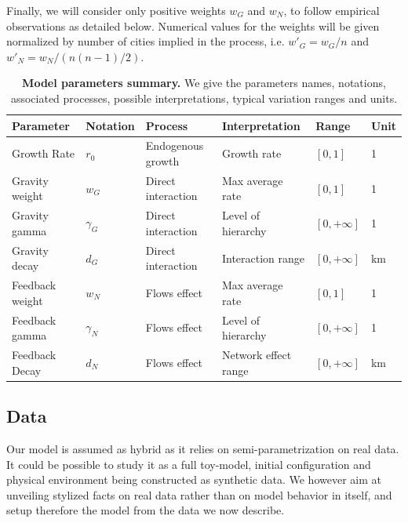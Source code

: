 \documentclass{article}
\begin{document}
Finally, we will consider only positive weights $w_G$ and $w_N$, to follow empirical observations as detailed below. Numerical values for the weights will be given normalized by number of cities implied in the process, i.e. ${w'}_G = w_G / n$ and ${w'}_N = w_N / (n (n-1) / 2)$.



\begin{table}[ht]
\small\sf\centering
\caption{\textbf{Model parameters summary.} We give the parameters names, notations, associated processes, possible interpretations, typical variation ranges and units.}\label{tab:parameters}
\hspace{-0.5cm}
\begin{tabular}{|l|l|l|l|l|l|}
\hline
Parameter & Notation & Process & Interpretation & Range & Unit\\
\hline
Growth Rate & $r_0$ & Endogenous growth & Growth rate & $\left[ 0,1\right]$ & 1 \\
Gravity weight & $w_G$ & Direct interaction & Max average rate & $\left[ 0,1\right]$ & 1 \\
Gravity gamma & $\gamma_G$ & Direct interaction & Level of hierarchy & $\left[ 0,+\infty\right]$ & 1 \\
Gravity decay & $d_G$ & Direct interaction & Interaction range & $\left[ 0,+\infty\right]$ & km \\
Feedback weight & $w_N$ & Flows effect & Max average rate & $\left[ 0,1\right]$  & 1\\
Feedback gamma & $\gamma_N$ & Flows effect & Level of hierarchy & $\left[ 0,+\infty\right]$ & 1\\
Feedback Decay & $d_N$ & Flows effect & Network effect range & $\left[ 0,+\infty\right]$ & km \\
\hline
\end{tabular}
\end{table}



\subsection*{Data}


Our model is assumed as hybrid as it relies on semi-parametrization on real data. It could be possible to study it as a full toy-model, initial configuration and physical environment being constructed as synthetic data. We however aim at unveiling stylized facts on real data rather than on model behavior in itself, and setup therefore the model from the data we now describe.
\end{document}
